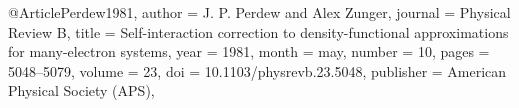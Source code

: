 @Article{Perdew1981,
  author    = {J. P. Perdew and Alex Zunger},
  journal   = {Physical Review B},
  title     = {Self-interaction correction to density-functional approximations for many-electron systems},
  year      = {1981},
  month     = {may},
  number    = {10},
  pages     = {5048--5079},
  volume    = {23},
  doi       = {10.1103/physrevb.23.5048},
  publisher = {American Physical Society ({APS})},
}